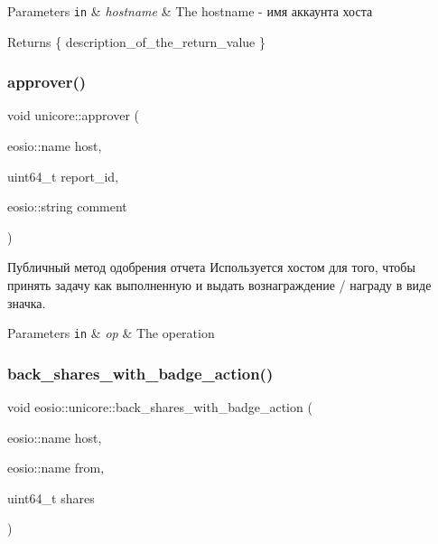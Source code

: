 \begin{DoxyParams}[1]{Parameters}
\mbox{\tt in}  & {\em hostname} & The hostname -\/ имя аккаунта хоста\\
\hline
\end{DoxyParams}
\begin{DoxyReturn}{Returns}
\{ description\+\_\+of\+\_\+the\+\_\+return\+\_\+value \} 
\end{DoxyReturn}
\mbox{\label{classeosio_1_1unicore_a765b3c6b36dc26922fec8c1236e3d154}} 
\subsubsection{\texorpdfstring{approver()}{approver()}}
{\footnotesize\ttfamily void unicore\+::approver (\begin{DoxyParamCaption}\item[{eosio\+::name}]{host,  }\item[{uint64\+\_\+t}]{report\+\_\+id,  }\item[{eosio\+::string}]{comment }\end{DoxyParamCaption})}



Публичный метод одобрения отчета Используется хостом для того, чтобы принять задачу как выполненную и выдать вознаграждение / награду в виде значка. 


\begin{DoxyParams}[1]{Parameters}
\mbox{\tt in}  & {\em op} & The operation \\
\hline
\end{DoxyParams}
\mbox{\label{classeosio_1_1unicore_a01a9d82308c52ec8c93653d310751d2b}} 
\subsubsection{\texorpdfstring{back\+\_\+shares\+\_\+with\+\_\+badge\+\_\+action()}{back\_shares\_with\_badge\_action()}}
{\footnotesize\ttfamily void eosio\+::unicore\+::back\+\_\+shares\+\_\+with\+\_\+badge\+\_\+action (\begin{DoxyParamCaption}\item[{eosio\+::name}]{host,  }\item[{eosio\+::name}]{from,  }\item[{uint64\+\_\+t}]{shares }\end{DoxyParamCaption})\hspace{0.3cm}{\ttfamily [static]}}



